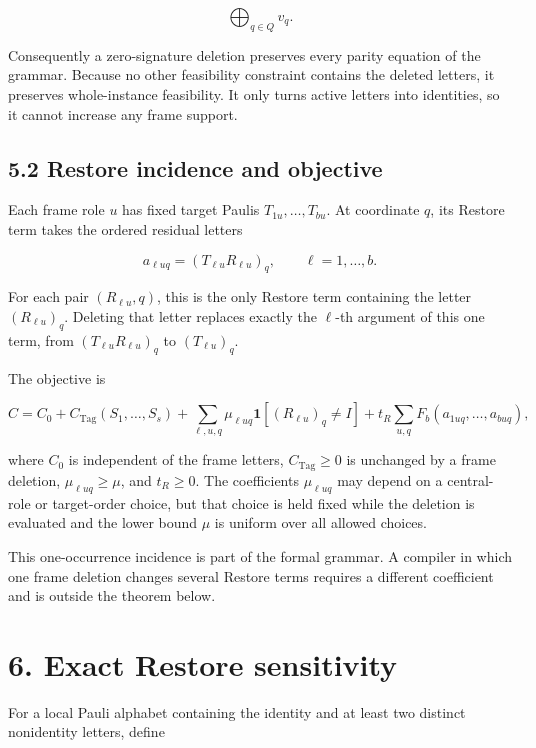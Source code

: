 \documentclass[11pt]{article}
\begin{document}
\[
\bigoplus_{q\in Q}v_q.
\]

Consequently a zero-signature deletion preserves every parity equation of the grammar. Because no other feasibility constraint contains the deleted letters, it preserves whole-instance feasibility. It only turns active letters into identities, so it cannot increase any frame support.

\hypertarget{restore-incidence-and-objective}{%
\subsection*{5.2 Restore incidence and objective}\label{restore-incidence-and-objective}}

Each frame role \(u\) has fixed target Paulis \(T_{1u},\ldots,T_{bu}\). At coordinate \(q\), its Restore term takes the ordered residual letters

\[
a_{\ell uq}=(T_{\ell u}R_{\ell u})_q,
\qquad \ell=1,\ldots,b.
\]

For each pair \((R_{\ell u},q)\), this is the only Restore term containing the letter \((R_{\ell u})_q\). Deleting that letter replaces exactly the \(\ell\)-th argument of this one term, from \((T_{\ell u}R_{\ell u})_q\) to \((T_{\ell u})_q\).

The objective is

\[
C=C_0+C_{\mathrm{Tag}}(S_1,\ldots,S_s)
+\sum_{\ell,u,q}\mu_{\ell uq}\mathbf{1}[(R_{\ell u})_q\neq I]
+t_R\sum_{u,q}F_b(a_{1uq},\ldots,a_{buq}),
\]

where \(C_0\) is independent of the frame letters, \(C_{\mathrm{Tag}}\geq0\) is unchanged by a frame deletion, \(\mu_{\ell uq}\geq\mu\), and \(t_R\geq0\). The coefficients \(\mu_{\ell uq}\) may depend on a central-role or target-order choice, but that choice is held fixed while the deletion is evaluated and the lower bound \(\mu\) is uniform over all allowed choices.

This one-occurrence incidence is part of the formal grammar. A compiler in which one frame deletion changes several Restore terms requires a different coefficient and is outside the theorem below.

\hypertarget{exact-restore-sensitivity}{%
\section*{6. Exact Restore sensitivity}\label{exact-restore-sensitivity}}

For a local Pauli alphabet containing the identity and at least two distinct nonidentity letters, define
\end{document}
